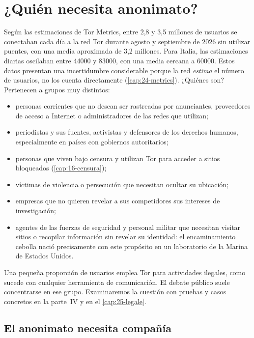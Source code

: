 \section{¿Quién necesita anonimato?}\label{sec:anon-utenti}

Según las estimaciones de Tor Metrics, entre 2,8 y 3,5 millones de usuarios se conectaban cada día a la red Tor durante agosto y septiembre de 2026 sin utilizar puentes, con una media aproximada de 3,2 millones. Para Italia, las estimaciones diarias oscilaban entre \num{44000} y \num{83000}, con una media cercana a \num{60000}. Estos datos presentan una incertidumbre considerable porque la red \emph{estima} el número de usuarios, no los cuenta directamente (\cref{cap:24-metrics}). ¿Quiénes son? Pertenecen a grupos muy distintos:
\begin{itemize}
  \item personas corrientes que no desean ser rastreadas por anunciantes, proveedores de acceso a Internet o administradores de las redes que utilizan;
  \item periodistas y sus fuentes, activistas y defensores de los derechos humanos, especialmente en países con gobiernos autoritarios;
  \item personas que viven bajo censura y utilizan Tor para acceder a sitios bloqueados (\cref{cap:16-censura});
  \item víctimas de violencia o persecución que necesitan ocultar su ubicación;
  \item empresas que no quieren revelar a sus competidores sus intereses de investigación;
  \item agentes de las fuerzas de seguridad y personal militar que necesitan visitar sitios o recopilar información sin revelar su identidad: el encaminamiento cebolla nació precisamente con este propósito en un laboratorio de la Marina de Estados Unidos.
\end{itemize}

Una pequeña proporción de usuarios emplea Tor para actividades ilegales, como sucede con cualquier herramienta de comunicación. El debate público suele concentrarse en ese grupo. Examinaremos la cuestión con pruebas y casos concretos en la parte~IV y en el \cref{cap:25-legale}.

\subsection{El anonimato necesita compañía}

